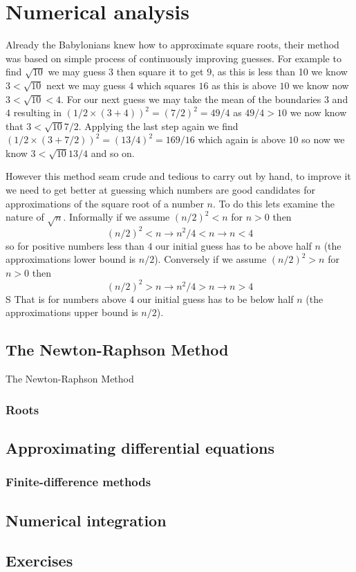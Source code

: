 \chapter{Numerical analysis}
Already the Babylonians knew how to approximate square roots, their method was based on simple process of continuously improving guesses. For example to find $\sqrt{10}$ we may guess $3$ then square it to get $9$, as this is less than 10 we know $3 < \sqrt{10}$ next we may guess $4$ which squares $16$ as this is above $10$ we know now $3 < \sqrt{10} < 4$. For our next guess we may take the mean of the boundaries $3$ and $4$ resulting in $(1/2 \times (3+4))^2 = (7/2)^2 = 49/4$ as $49/4 > 10$ we now know that $3 < \sqrt{10} 7/2$. Applying the last step again we find $(1/2 \times (3 + 7/2))^2 = (13/4)^2 = 169/16$ which again is above $10$ so now we know $3 < \sqrt{10} 13/4$ and so on.

However this method seam crude and tedious to carry out by hand, to improve it we need to get better at guessing which numbers are good candidates for approximations of the square root of a number $n$. To do this lets examine the nature of $\sqrt{n}$. Informally if we assume $(n/2)^2 < n$ for $n>0$ then
\[
(n/2)^2 < n \rightarrow n^2/4 < n \rightarrow n < 4
\]
so for positive numbers less than $4$ our initial guess has to be above half $n$ (the approximations lower bound is $n/2$). Conversely if we assume $(n/2)^2 > n$ for $n>0$ then
\[
(n/2)^2 > n \rightarrow n^2/4 > n \rightarrow n > 4
\]
S
That is for numbers above $4$ our initial guess has to be below half $n$ (the approximations upper bound is $n/2$).

\section{The Newton-Raphson Method}
The Newton-Raphson Method

\subsection{Roots}

\section{Approximating differential equations}
\subsection{Finite-difference methods}

\section{Numerical integration}

\section{Exercises}
\begin{ExerciseList}
\end{ExerciseList}
